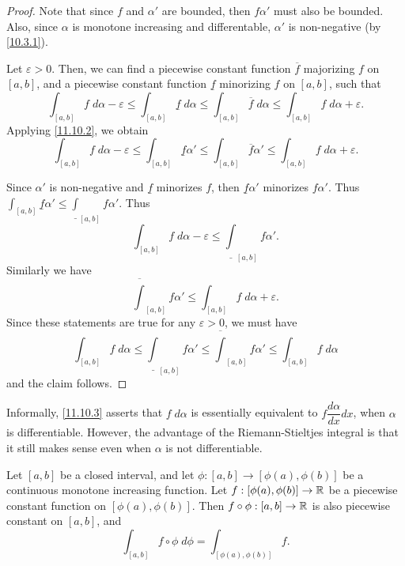 \begin{proof}
  Note that since \(f\) and \(\alpha'\) are bounded, then \(f \alpha'\) must also be bounded.
  Also, since \(\alpha\) is monotone increasing and differentable, \(\alpha'\) is non-negative (by \cref{10.3.1}).

  Let \(\varepsilon > 0\).
  Then, we can find a piecewise constant function \(\overline{f}\) majorizing \(f\) on \([a, b]\), and a piecewise constant function \(\underline{f}\) minorizing \(f\) on \([a, b]\), such that
  \[
    \int_{[a, b]} f \; d \alpha - \varepsilon \leq \int_{[a, b]} \underline{f} \; d \alpha \leq \int_{[a, b]} \overline{f} \; d \alpha \leq \int_{[a, b]} f \; d \alpha + \varepsilon.
  \]
  Applying \cref{11.10.2}, we obtain
  \[
    \int_{[a, b]} f \; d \alpha - \varepsilon \leq \int_{[a, b]} \underline{f} \alpha' \leq \int_{[a, b]} \overline{f} \alpha' \leq \int_{[a, b]} f \; d \alpha + \varepsilon.
  \]

  Since \(\alpha'\) is non-negative and \(\underline{f}\) minorizes \(f\), then \(\underline{f} \alpha'\) minorizes \(f \alpha'\).
  Thus \(\int_{[a, b]} \underline{f} \alpha' \leq \underline{\int}_{[a, b]} f \alpha'\).
  Thus
  \[
    \int_{[a, b]} f \; d \alpha - \varepsilon \leq \underline{\int}_{[a, b]} f \alpha'.
  \]
  Similarly we have
  \[
    \overline{\int}_{[a, b]} f \alpha' \leq \int_{[a, b]} f \; d \alpha + \varepsilon.
  \]
  Since these statements are true for any \(\varepsilon > 0\), we must have
  \[
    \int_{[a, b]} f \; d \alpha \leq \underline{\int}_{[a, b]} f \alpha' \leq \overline{\int}_{[a, b]} f \alpha' \leq \int_{[a, b]} f \; d \alpha
  \]
  and the claim follows.
\end{proof}

\begin{rmk}\label{11.10.4}
  Informally, \cref{11.10.3} asserts that \(f \; d \alpha\) is essentially equivalent to \(f \dfrac{d \alpha}{dx} dx\), when \(\alpha\) is differentiable.
  However, the advantage of the Riemann-Stieltjes integral is that it still makes sense even when \(\alpha\) is not differentiable.
\end{rmk}

\begin{lem}\label{11.10.5}
  Let \([a, b]\) be a closed interval, and let \(\phi : [a, b] \to [\phi(a), \phi(b)]\) be a continuous monotone increasing function.
  Let \(f : [\phi(a), \phi(b)] \to \mathbb{R}\) be a piecewise constant function on \([\phi(a), \phi(b)]\).
  Then \(f \circ \phi : [a, b] \to \mathbb{R}\) is also piecewise constant on \([a, b]\), and
  \[
    \int_{[a, b]} f \circ \phi \; d \phi = \int_{[\phi(a), \phi(b)]} f.
  \]
\end{lem}


